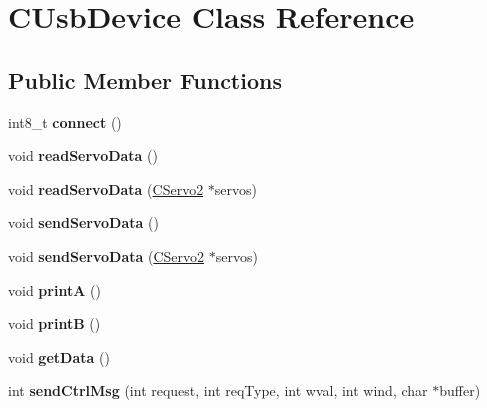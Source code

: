 \hypertarget{class_c_usb_device}{
\section{CUsbDevice Class Reference}
\label{class_c_usb_device}
}
\subsection*{Public Member Functions}
\begin{DoxyCompactItemize}
\item 
\hypertarget{class_c_usb_device_a7d0f11d555238876562b24ea1e39ec0c}{
int8\_\-t {\bfseries connect} ()}
\label{class_c_usb_device_a7d0f11d555238876562b24ea1e39ec0c}

\item 
\hypertarget{class_c_usb_device_a9f9e12007fa75353ce55fd85816797ab}{
void {\bfseries readServoData} ()}
\label{class_c_usb_device_a9f9e12007fa75353ce55fd85816797ab}

\item 
\hypertarget{class_c_usb_device_a294d4d6801d993a742f548b6dc9aa85c}{
void {\bfseries readServoData} (\hyperlink{class_c_servo2}{CServo2} $\ast$servos)}
\label{class_c_usb_device_a294d4d6801d993a742f548b6dc9aa85c}

\item 
\hypertarget{class_c_usb_device_a77de8285f37ac6d8c8fe1ebb3246e6be}{
void {\bfseries sendServoData} ()}
\label{class_c_usb_device_a77de8285f37ac6d8c8fe1ebb3246e6be}

\item 
\hypertarget{class_c_usb_device_a2f25f7165a5554dc746a3dbadd061985}{
void {\bfseries sendServoData} (\hyperlink{class_c_servo2}{CServo2} $\ast$servos)}
\label{class_c_usb_device_a2f25f7165a5554dc746a3dbadd061985}

\item 
\hypertarget{class_c_usb_device_a129cb84b58cfdb272536fe4ab98f3998}{
void {\bfseries printA} ()}
\label{class_c_usb_device_a129cb84b58cfdb272536fe4ab98f3998}

\item 
\hypertarget{class_c_usb_device_aefc74a375701e6300d9bbb7399b645a6}{
void {\bfseries printB} ()}
\label{class_c_usb_device_aefc74a375701e6300d9bbb7399b645a6}

\item 
\hypertarget{class_c_usb_device_a1677e807377057bc3f29f383a1c1afd2}{
void {\bfseries getData} ()}
\label{class_c_usb_device_a1677e807377057bc3f29f383a1c1afd2}

\item 
\hypertarget{class_c_usb_device_ab6b13421bf961840c5c0e8fdd7f65c60}{
int {\bfseries sendCtrlMsg} (int request, int reqType, int wval, int wind, char $\ast$buffer)}
\label{class_c_usb_device_ab6b13421bf961840c5c0e8fdd7f65c60}

\end{DoxyCompactItemize}
